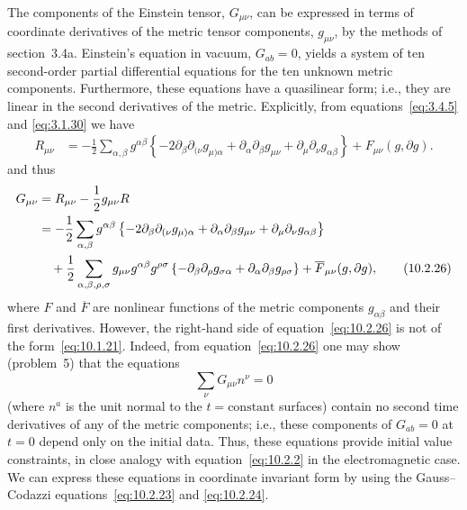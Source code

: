 The components of the Einstein tensor, \(G_{\mu\nu}\), can be expressed in terms of
coordinate derivatives of the metric tensor components, \(g_{\mu\nu}\), by the methods
of section~3.4a. Einstein's equation in vacuum, \(G_{ab}=0\), yields a system of ten
second-order partial differential equations for the ten unknown metric components.
Furthermore, these equations have a quasilinear form; i.e., they are linear in the
second derivatives of the metric. Explicitly, from equations~\eqref{eq:3.4.5} and
\eqref{eq:3.1.30} we have
\begin{align}
  R_{\mu\nu}
  &=-\frac12\sum_{\alpha,\beta}g^{\alpha\beta}
    \left\{-2\partial_\beta\partial_{(\nu}g_{\mu)\alpha}
      +\partial_\alpha\partial_\beta g_{\mu\nu}
      +\partial_\mu\partial_\nu g_{\alpha\beta}\right\}
    +F_{\mu\nu}(g,\partial g).
  \tag{10.2.25}\label{eq:10.2.25}
\end{align}
and thus
\begin{align}
  G_{\mu\nu}
  &=R_{\mu\nu}-\frac12g_{\mu\nu}R \notag\\
  &=-\frac12\sum_{\alpha,\beta}g^{\alpha\beta}
    \left\{-2\partial_\beta\partial_{(\nu}g_{\mu)\alpha}
      +\partial_\alpha\partial_\beta g_{\mu\nu}
      +\partial_\mu\partial_\nu g_{\alpha\beta}\right\} \notag\\
  &\quad+\frac12\sum_{\alpha,\beta,\rho,\sigma}
    g_{\mu\nu}g^{\alpha\beta}g^{\rho\sigma}
    \left\{-\partial_\beta\partial_\rho g_{\sigma\alpha}
      +\partial_\alpha\partial_\beta g_{\rho\sigma}\right\}
    +\overline F_{\mu\nu}(g,\partial g),
  \tag{10.2.26}\label{eq:10.2.26}
\end{align}
where \(F\) and \(\overline F\) are nonlinear functions of the metric components
\(g_{\alpha\beta}\) and their first derivatives. However, the right-hand side of
equation~\eqref{eq:10.2.26} is not of the form~\eqref{eq:10.1.21}. Indeed, from
equation~\eqref{eq:10.2.26} one may show (problem~5) that the equations
\begin{equation}
  \sum_\nu G_{\mu\nu}n^\nu=0
  \tag{10.2.27}\label{eq:10.2.27}
\end{equation}
(where \(n^a\) is the unit normal to the \(t=\text{constant}\) surfaces) contain no
second time derivatives of any of the metric components; i.e., these components of
\(G_{ab}=0\) at \(t=0\) depend only on the initial data. Thus, these equations provide
initial value constraints, in close analogy with equation~\eqref{eq:10.2.2} in the
electromagnetic case. We can express these equations in coordinate invariant form by
using the Gauss--Codazzi equations~\eqref{eq:10.2.23} and \eqref{eq:10.2.24}.
